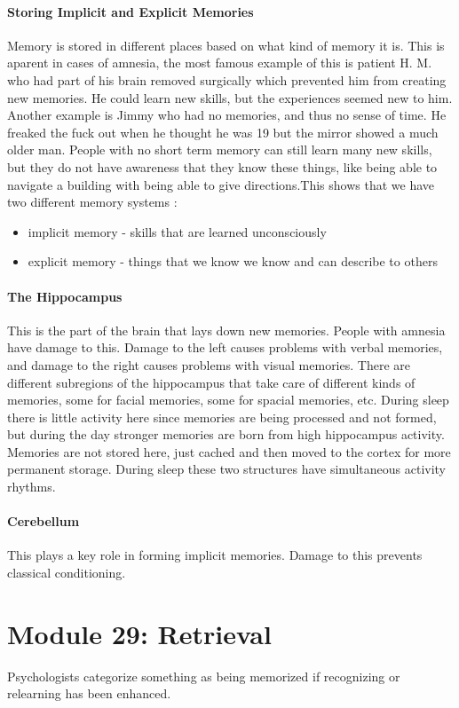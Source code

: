 \documentclass[12pt]{article}
\begin{document}
\subsection*{Storing Implicit and Explicit Memories} Memory is stored in different places based on what kind of memory it is. This is aparent in cases of amnesia, the most famous example of this is patient H. M. who had part of his brain removed surgically which prevented him from creating new memories. He could learn new skills, but the experiences seemed new to him. Another example is Jimmy who had no memories, and thus no sense of time. He freaked the fuck out when he thought he was 19 but the mirror showed a much older man. People with no short term memory can still learn many new skills, but they do not have awareness that they know these things, like being able to navigate a building with being able to give directions.This shows that we have two different memory systems :
\begin{itemize}
\item implicit memory - skills that are learned unconsciously
\item explicit memory - things that we know we know and can describe to others
\end{itemize}
\subsection*{The Hippocampus} This is the part of the brain that lays down new memories. People with amnesia have damage to this. Damage to the left causes problems with verbal memories, and damage to the right causes problems with visual memories. There are different subregions of the hippocampus that take care of different kinds of memories, some for facial memories, some for spacial memories, etc. During sleep there is little activity here since memories are being processed and not formed, but during the day stronger memories are born from high hippocampus activity. Memories are not stored here, just cached and then moved to the cortex for more permanent storage. During sleep these two structures have simultaneous activity rhythms.
\subsection*{Cerebellum} This plays a key role in forming implicit memories. Damage to this prevents classical conditioning.

\part*{Module 29: Retrieval} 
Psychologists categorize something as being memorized if recognizing or relearning has been enhanced. 
\end{document}
